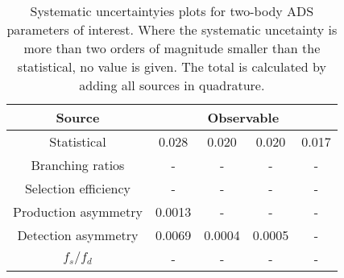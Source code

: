 \begin{table}
  \centering
  \begin{tabular}{ccccc}
      \toprule
      Source & \multicolumn{4}{c}{Observable} \\
      \midrule
      Statistical & 0.028 & 0.020 & 0.020 & 0.017 \\
      \midrule
      Branching ratios & \-- & \-- & \-- & \-- \\
      Selection efficiency & \-- & \-- & \-- & \-- \\
      Production asymmetry & 0.0013 & \-- & \-- & \-- \\
      Detection asymmetry & 0.0069 & 0.0004 & 0.0005 & \-- \\
      $f_s/f_d$ & \-- & \-- & \-- & \-- \\
      \bottomrule
  \end{tabular}
  \caption{Systematic uncertaintyies plots for two-body ADS parameters of interest. Where the systematic uncetainty is more than two orders of magnitude smaller than the statistical, no value is given. The total is calculated by adding all sources in quadrature.}
\label{tab:twoBody_ADS_systematics}
\end{table}
